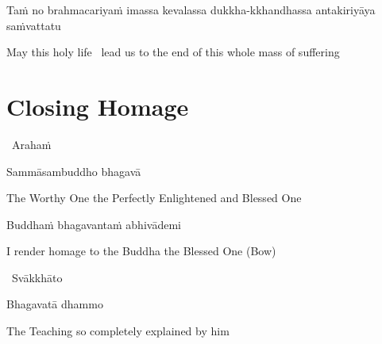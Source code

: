 \begin{pali-hang}
  Taṁ no brahmacariyaṁ imassa kevalassa dukkha-kkhandhassa antakiriyāya saṁvattatu
\end{pali-hang}

\begin{english}
  May this holy life \breathmark\ lead us to the end of this whole mass of suffering
\end{english}

\suttaRef{[Thai]}




\section{Closing Homage}
\label{closing-homage}

\vspace{5pt}

\begin{leader}
  \anglebracketleft\ \hspace{-0.5mm}Arahaṁ \hspace{-0.5mm}\anglebracketright\
\end{leader}

\vspace{-0.5cm}

Sammāsambuddho bhagavā

\begin{english}
  The Worthy One the Perfectly Enlightened and Blessed One
\end{english}

Buddhaṁ bhagavantaṁ abhivādemi

\begin{english}
  I render homage to the Buddha the Blessed One \hfill{\textnormal{\ifafiveversion\fontsize{12.5}{18}\fi\ifasixversion\fontsize{9}{13}\fi\selectfont (Bow)}}
\end{english}

\begin{leader}
  \anglebracketleft\ \hspace{-0.5mm}Svākkhāto \hspace{-0.5mm}\anglebracketright\
\end{leader}

\vspace{-0.5cm}

Bhagavatā dhammo

\begin{english}
  The Teaching so completely explained by him
\end{english}

